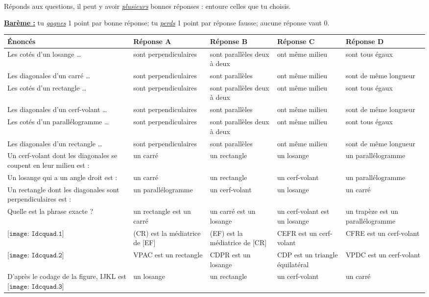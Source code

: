 Réponds aux questions, il peut y avoir
{\textit{\underline{plusieurs}}} bonnes réponses : entoure celles que
tu choisis.
\par{\textbf{\underline{Barème :}}} tu {\textit{\underline{gagnes}}} 1
point par bonne réponse; tu {\textit{\underline{perds}}} 1 point par
réponse fausse; aucune réponse vaut 0.

{\small
\begin{tabular}{|m{4.5cm}|m{2.5cm}|m{2.5cm}|m{2.5cm}|m{2.5cm}|}
\hline
\quad \'Enoncés & \quad Réponse A & \quad Réponse B & \quad Réponse C & \quad Réponse D \\
\hline
Les cotés d'un losange \dots & sont perpendiculaires & sont parallèles deux à deux & ont même milieu & sont tous égaux \\
\hline
Les diagonales d'un carré \dots & sont perpendiculaires & sont parallèles & ont même milieu & sont de même longueur \\
\hline
Les cotés d'un rectangle \dots & sont perpendiculaires & sont parallèles deux à deux & ont même milieu & sont tous égaux \\
\hline
Les diagonales d'un cerf-volant \dots & sont perpendiculaires & sont parallèles & ont même milieu & sont de même longueur \\
\hline
Les cotés d'un parallélogramme \dots & sont perpendiculaires & sont parallèles deux à deux & ont même milieu & sont tous égaux \\
\hline
Les diagonales d'un rectangle \dots & sont perpendiculaires & sont parallèles & ont même milieu & sont de même longueur \\
\hline
Un cerf-volant dont les diagonales se coupent en leur milieu est : & un carré & un rectangle & un losange & un parallélogramme \\
\hline
Un losange qui a un angle droit est : & un carré & un rectangle & un cerf-volant & un parallélogramme \\
\hline
Un rectangle dont les diagonales sont perpendiculaires est : & un parallélogramme & un cerf-volant& un losange & un carré \\
\hline
Quelle est la phrase exacte ? & un rectangle est un carré & un carré est un losange & un cerf-volant est un losange & un trapèze est un parallélogramme \\
\hline
$\texttt{[image: Idcquad.1]}$ & (CR) est la médiatrice de [EF] & (EF) est la médiatrice de [CR] & CEFR est un cerf-volant & CFRE est un cerf-volant \\
\hline
$\texttt{[image: Idcquad.2]}$ & VPAC est un rectangle & CDPR est un losange & CDP est un triangle équilatéral & VPDC est un cerf-volant \\
\hline
D'après le codage de la figure, IJKL est $\texttt{[image: Idcquad.3]}$ & un losange & un rectangle & un cerf-volant & un carré \\
\hline
\end{tabular}
}
